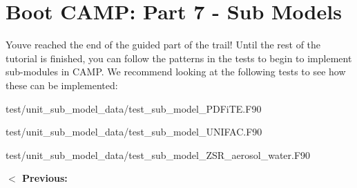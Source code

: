 \chapter{Boot CAMP\+: Part 7 -\/ Sub Models}
\hypertarget{camp_tutorial_part_7}{}\label{camp_tutorial_part_7}
You\textquotesingle{}ve reached the end of the guided part of the trail! Until the rest of the tutorial is finished, you can follow the patterns in the tests to begin to implement sub-\/modules in CAMP. We recommend looking at the following tests to see how these can be implemented\+:


\begin{DoxyItemize}
\item {\ttfamily test/unit\+\_\+sub\+\_\+model\+\_\+data/test\+\_\+sub\+\_\+model\+\_\+\+PDFi\+TE.\+F90}
\item {\ttfamily test/unit\+\_\+sub\+\_\+model\+\_\+data/test\+\_\+sub\+\_\+model\+\_\+\+UNIFAC.\+F90}
\item {\ttfamily test/unit\+\_\+sub\+\_\+model\+\_\+data/test\+\_\+sub\+\_\+model\+\_\+\+ZSR\+\_\+aerosol\+\_\+water.\+F90}
\end{DoxyItemize}

 {\bfseries{ \texorpdfstring{$<$}{<} Previous\+: }}     